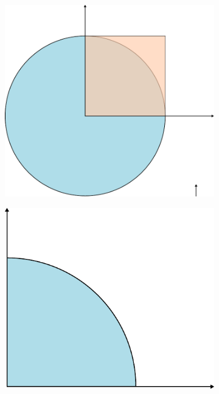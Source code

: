 \documentclass[11pt,a4paper]{article}
\begin{document}
\begin{itemize}
\begin{itemize}
        
        \begin{figure}[!htb]
            \centering
            \begin{subfigure}[b]{0.24\textwidth}
                \includegraphics[width=\textwidth]{figures/SD.pdf}
                \caption{}\label{fig:SD}
            \end{subfigure}
            \begin{subfigure}[b]{0.24\textwidth}
                \includegraphics[width=\textwidth]{figures/intersection.pdf}

\end{subfigure}
\end{figure}
\end{itemize}
\end{itemize}
\end{document}
